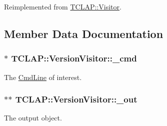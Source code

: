 Reimplemented from \hyperlink{class_t_c_l_a_p_1_1_visitor_a08625664637579a24ba2f0ab3e713670}{T\+C\+L\+A\+P\+::\+Visitor}.



\subsection{Member Data Documentation}
\hypertarget{class_t_c_l_a_p_1_1_version_visitor_ac789d900e73daa8b4b53a1e9b80b756e}{
\subsubsection[{\+\_\+cmd}]{$\ast$ T\+C\+L\+A\+P\+::\+Version\+Visitor\+::\+\_\+cmd\hspace{0.3cm}{\ttfamily [protected]}}}\label{class_t_c_l_a_p_1_1_version_visitor_ac789d900e73daa8b4b53a1e9b80b756e}
The \hyperlink{class_t_c_l_a_p_1_1_cmd_line}{Cmd\+Line} of interest. \hypertarget{class_t_c_l_a_p_1_1_version_visitor_ab4c9f44a2bd62830e42f79b35ac4d300}{
\subsubsection[{\+\_\+out}]{$\ast$$\ast$ T\+C\+L\+A\+P\+::\+Version\+Visitor\+::\+\_\+out\hspace{0.3cm}{\ttfamily [protected]}}}\label{class_t_c_l_a_p_1_1_version_visitor_ab4c9f44a2bd62830e42f79b35ac4d300}
The output object. 